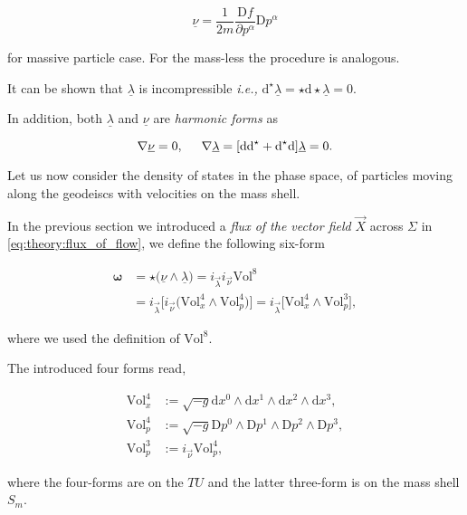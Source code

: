 \begin{equation}
\underline{\nu} = \frac{1}{2m}\frac{\text{D}f}{\partial p^{\alpha}}\text{D}p^{\alpha}
\end{equation} 

for massive particle case. For the mass-less the procedure is analogous.

It can be shown that $\underline{\lambda}$ is incompressible \textit{i.e.,} $\text{d}^{\star}\underline{\lambda} =\star \text{d}\star\underline{\lambda} =0$.

In addition, both $\underline{\lambda}$ and $\underline{\nu}$ are \textit{harmonic forms} as 

\begin{equation}
\nabla\underline{\nu} = 0 , \hspace{5mm}
\nabla\underline{\lambda} = [\text{dd}^{\star} + \text{d}^{\star}\text{d}]\underline{\lambda} = 0.
\end{equation}

Let us now consider the density of states in the phase space, of particles moving along the geodeiscs with velocities on the mass shell.

In the previous section we introduced a \textit{flux of the vector field} $\vec{X}$ across $\Sigma$ in \ref{eq:theory:flux_of_flow}, we define the following six-form

\begin{align}
\boldsymbol{\omega} &= \star\big(\underline{\nu}\wedge\underline{\lambda}\big) = i_{\vec{\lambda}} i_{\vec{\nu}}\text{Vol}^8 \\
&= i_{\vec{\lambda}}\Big[i_{\vec{\nu}}\big(\text{Vol}^{4}_{x}\wedge\text{Vol}^{4}_{p}\big)\Big] = i_{\vec{\lambda}} \big[\text{Vol}^{4}_{x}\wedge\text{Vol}^{3}_{p}\big],
\end{align}

where we used the definition of $\text{Vol}^8$. 

The introduced four forms read,

\begin{align}
\text{Vol}_x ^4 &:= \sqrt{-g} \text{d}x^{0} \wedge \text{d}x^{1} \wedge \text{d}x^{2} \wedge \text{d}x^{3}, \\
\text{Vol}_p ^4 &:= \sqrt{-g} \text{D}p^{0} \wedge \text{D}p^{1} \wedge \text{D}p^{2} \wedge \text{D}p^{3}, \\
\text{Vol}_p ^3 &:= i_{\vec{\nu}}\text{Vol}_p ^4,
\end{align}

where the four-forms are on the $TU$ and the latter three-form is on the mass shell $S_m$.

